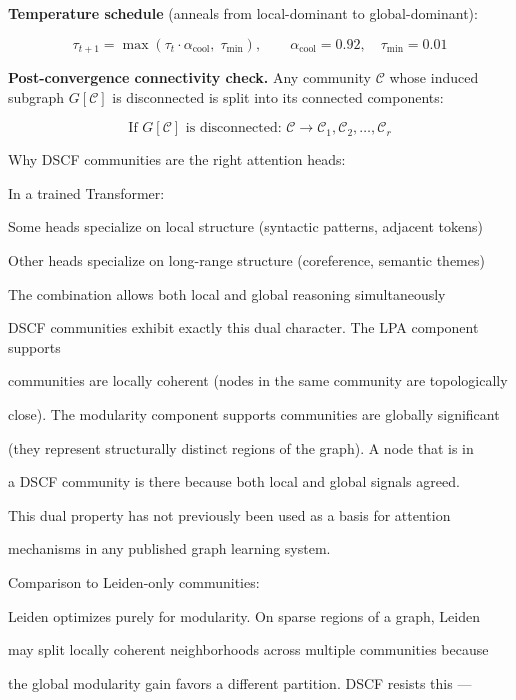 \documentclass[10pt,journal,compsoc]{IEEEtran}
\begin{document}
\textbf{Temperature schedule} (anneals from local-dominant to global-dominant):

\begin{equation}
\tau_{t+1} = \max\!\left(\tau_t \cdot \alpha_{\mathrm{cool}},\; \tau_{\min}\right), \qquad \alpha_{\mathrm{cool}} = 0.92, \quad \tau_{\min} = 0.01
\end{equation}

\textbf{Post-convergence conne\-ctivity check.} Any community $\mathcal{C}$ whose induced subgraph $G[\mathcal{C}]$ is disco\-nnected is split into its connected components:

\begin{equation}
\text{If } G[\mathcal{C}] \text{ is disconnected: } \mathcal{C} \to \mathcal{C}_1, \mathcal{C}_2, \ldots, \mathcal{C}_r
\end{equation}

Why DSCF communities are the right attention heads:

In a trained Transformer:

Some heads specialize on local structure (syntactic patterns, adjacent tokens)

Other heads specialize on long-range structure (coreference, semantic themes)

The combination allows both local and global reasoning simul\-taneously

DSCF communities exhibit exactly this dual character. The LPA component supports

communities are locally coherent (nodes in the same community are topol\-ogically

close). The modularity component supports communities are globally significant

(they represent struc\-turally distinct regions of the graph). A node that is in

a DSCF community is there because both local and global signals agreed.

This dual property has not previously been used as a basis for attention

mechanisms in any published graph learning system.

Comparison to Leiden-only communities:

Leiden optimizes purely for modularity. On sparse regions of a graph, Leiden

may split locally coherent neigh\-borhoods across multiple communities because

the global modularity gain favors a different partition. DSCF resists this —
\end{document}
